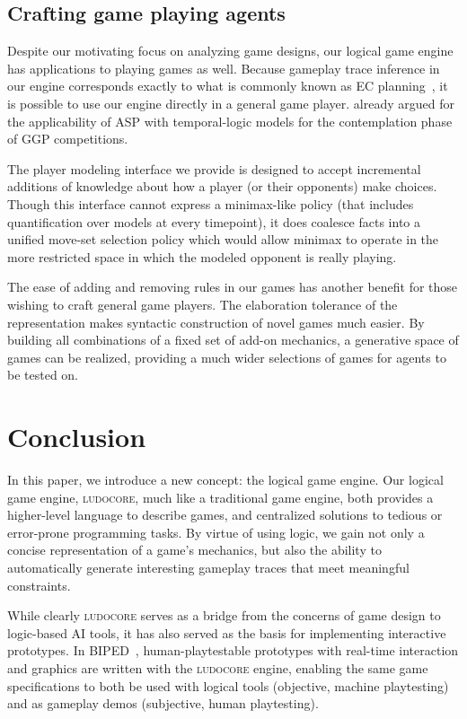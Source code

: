 \documentclass[conference]{IEEEtran}
\newcommand{\ludocore}{\textsc{ludocore}}
\begin{document}
\subsection{Crafting game playing agents}

Despite our motivating focus on analyzing game designs, our logical game engine
has applications to playing games as well. Because gameplay trace inference in
our engine corresponds exactly to what is commonly known as EC
planning~\citep{ECplanning}, it is possible to use our engine directly in a
general game player. \citet{Thielscher:singleplayer} already argued for the
applicability of ASP with temporal-logic models for the contemplation phase of
GGP competitions.

The player modeling interface we provide is designed to accept incremental
additions of knowledge about how a player (or their opponents) make choices.
Though this interface cannot express a minimax-like policy (that includes
quantification over models at every timepoint), it does coalesce facts into a
unified move-set selection policy which would allow minimax to operate in the
more restricted space in which the modeled opponent is really playing.

The ease of adding and removing rules in our games has another benefit for
those wishing to craft general game players. The elaboration tolerance of the
representation makes syntactic construction of novel games much easier. By
building all combinations of a fixed set of add-on mechanics, a generative
space of games can be realized, providing a much wider selections of games for
agents to be tested on. 

\section{Conclusion}

In this paper, we introduce a new concept: the logical game engine. Our logical
game engine, \ludocore, much like a traditional game engine, both provides a
higher-level language to describe games, and centralized solutions to tedious
or error-prone programming tasks. By virtue of using logic, we gain not only a
concise representation of a game's mechanics, but also the ability to
automatically generate interesting gameplay traces that meet meaningful
constraints.

While clearly \ludocore{} serves as a bridge from the concerns of game design to
logic-based AI tools, it has also served as the basis for implementing
interactive prototypes. In BIPED~\citep{AIIDE09}, human-playtestable
prototypes with real-time interaction and graphics are written with the
\ludocore{} engine, enabling the same game specifications to both be used with
logical tools (objective, machine playtesting) and as gameplay demos
(subjective, human playtesting).
\end{document}
